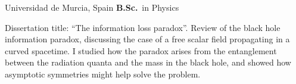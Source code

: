 			{%
				Universidad de Murcia, Spain}
			{%
				\textbf{B.Sc.}~in Physics}
			{%
				\begin{justify}\noindent
					Dissertation title: ``The information loss paradox''. \newline
					Review of the black hole information paradox, discussing the case of a free scalar field propagating in a curved spacetime. I studied how the paradox arises from the entanglement between the radiation quanta and the mass in the black hole, and showed how asymptotic symmetries might help solve the problem.
				\end{justify}
			}